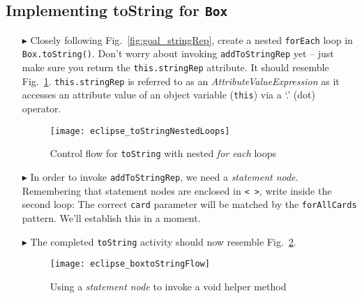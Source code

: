 \newpage
\hypertarget{stringRep tex}{}
\subsection{Implementing toString for \texttt{Box}}
\texHeader

\vspace{0.5cm}

\begin{itemize}
  
\item[$\blacktriangleright$] Closely following Fig.~\ref{fig:goal_stringRep}, create a nested \texttt{forEach} loop in \texttt{Box.toString()}.
Don't worry about invoking \texttt{addToStringRep} yet -- just make sure you return the \texttt{this.stringRep} attribute. It should resemble
Fig.~\ref{eclipse:emptyLoops}. \texttt{this.stringRep} is referred to as an \emph{AttributeValueExpression} as it
accesses an attribute value of an object variable (\texttt{this}) via a `.' (dot) operator.

\begin{figure}[htp]
\begin{center}
  \texttt{[image: eclipse\_toStringNestedLoops]}
  \caption{Control flow for \texttt{toString} with nested \emph{for each} loops}
  \label{eclipse:emptyLoops}
\end{center}
\end{figure}

\item[$\blacktriangleright$] In order to invoke \texttt{addToStringRep}, we need a \emph{statement node}. Remembering that statement nodes are enclosed in
\texttt{< >}, write inside the second loop:  
The correct \texttt{card} parameter will be matched by the \texttt{forAllCards} pattern. We'll establish this in a moment.

\vspace{0.5cm}

\item[$\blacktriangleright$] The completed \texttt{toString} activity should now resemble Fig.~\ref{eclipse:toStringFlow}.

\vspace{0.5cm}

\begin{figure}[htp]
\begin{center}
  \texttt{[image: eclipse\_boxtoStringFlow]}
  \caption{Using a \emph{statement node} to invoke a void helper method}
  \label{eclipse:toStringFlow}
\end{center}
\end{figure}


\end{itemize}
